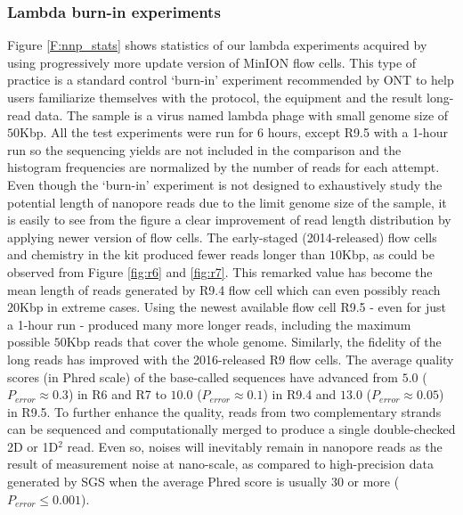 \subsubsection{Lambda burn-in experiments} 
Figure \ref{F:nnp_stats} shows statistics of our lambda experiments acquired by using progressively more update version of MinION flow cells. This type of practice is a standard control `burn-in' experiment recommended by ONT to help users familiarize themselves with the protocol, the equipment and the result long-read data. The sample is a virus named lambda phage with small genome size of $50$Kbp. All the test experiments were run for 6 hours, except R9.5 with a 1-hour run so the sequencing yields are not included in the comparison and the histogram frequencies are normalized by the number of reads for each attempt. Even though the `burn-in' experiment is not designed to exhaustively study the potential length of nanopore reads due to the limit genome size of the sample, it is easily to see from the figure a clear improvement of read length distribution by applying newer version of flow cells. The early-staged (2014-released) flow cells and chemistry in the kit produced fewer reads longer than $10$Kbp, as could be observed from Figure \ref{fig:r6} and \ref{fig:r7}. 
This remarked value has become the mean length of reads generated by R9.4 flow cell which can even possibly reach $20$Kbp in extreme cases. 
Using the newest available flow cell R9.5 - even for just a 1-hour run - produced many more longer reads, including the maximum possible $50$Kbp reads that cover the whole genome.  
Similarly, the fidelity of the long reads has improved with the 2016-released R9 flow cells. The average quality scores (in Phred scale) of the base-called sequences have advanced from $5.0$ ($P_{error} \approx 0.3$) in R6 and R7 to $10.0$ ($P_{error} \approx 0.1$) in R9.4 and $13.0$ ($P_{error} \approx 0.05$) in R9.5. 
To further enhance the quality, reads from two complementary strands can be sequenced and computationally merged to produce a single double-checked 2D or 1D$^2$ read.
Even so, noises will inevitably remain in nanopore reads as the result of measurement noise at nano-scale, as compared to high-precision data generated by SGS when the average Phred score is usually 30 or more ($P_{error} \leq 0.001$).

